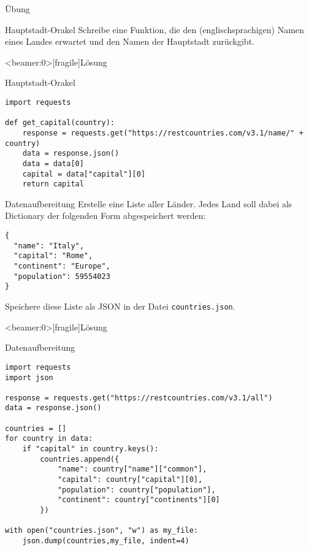 \begin{frame}{Übung}

\begin{block}{Hauptstadt-Orakel}
\vspace{2pt}
Schreibe eine Funktion, die den (englischsprachigen) Namen eines Landes erwartet und den Namen der Hauptstadt zurückgibt.
\end{block}
\end{frame}





\begin{frame}<beamer:0>[fragile]{Lösung}
\begin{solutionblock}{Hauptstadt-Orakel}
\begin{verbatim}
import requests

def get_capital(country): 
    response = requests.get("https://restcountries.com/v3.1/name/" + country)
    data = response.json()
    data = data[0]
    capital = data["capital"][0]
    return capital
\end{verbatim}
\end{solutionblock}
\end{frame}








\begin{fragile}[Übung]
\begin{block}{Datenaufbereitung}
\vspace{2pt}
Erstelle eine Liste aller Länder. Jedes Land soll dabei als Dictionary der folgenden Form abgespeichert werden: 
\begin{verbatim}
{
  "name": "Italy",
  "capital": "Rome",
  "continent": "Europe", 
  "population": 59554023
}
\end{verbatim} 
Speichere diese Liste als JSON in der Datei \texttt{countries.json}. 
\end{block}
\end{fragile}

\begin{frame}<beamer:0>[fragile]{Lösung}
\begin{solutionblock}{Datenaufbereitung}
\begin{verbatim}
import requests
import json 

response = requests.get("https://restcountries.com/v3.1/all")
data = response.json()

countries = []
for country in data: 
    if "capital" in country.keys():
        countries.append({
            "name": country["name"]["common"],
            "capital": country["capital"][0],
            "population": country["population"],
            "continent": country["continents"][0]
        }) 

with open("countries.json", "w") as my_file: 
    json.dump(countries,my_file, indent=4)
\end{verbatim}
\end{solutionblock}
\end{frame}




